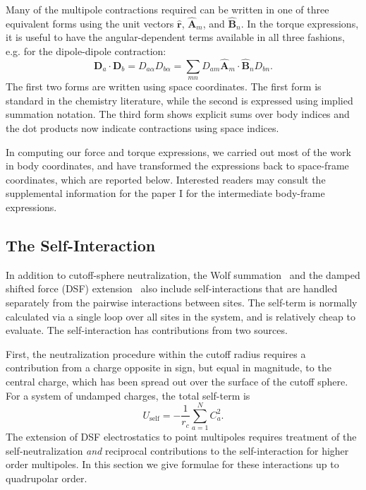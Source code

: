 Many of the multipole contractions required can be written in one of
three equivalent forms using the unit vectors $\hat{\mathbf{r}}$, $\hat{\mathbf{A}}_m$,
and $\hat{\mathbf{B}}_n$. In the torque expressions, it is useful to have the
angular-dependent terms available in all three fashions, e.g. for the
dipole-dipole contraction:
%
\begin{equation}
 \mathbf{D}_a \cdot \mathbf{D}_b
= D_{a \alpha} D_{b \alpha} =
\sum_{mn} D_{am} \hat{\mathbf{A}}_m \cdot \hat{\mathbf{B}}_n D_{bn}.
\end{equation}
%
The first two forms are written using space coordinates.  The first
form is standard in the chemistry literature, while the second is
expressed using implied summation notation.  The third form shows
explicit sums over body indices and the dot products now indicate
contractions using space indices. 

In computing our force and torque expressions, we carried out most of
the work in body coordinates, and have transformed the expressions
back to space-frame coordinates, which are reported below.  Interested
readers may consult the supplemental information for the paper I \cite{PaperI} for the intermediate body-frame expressions.\cite{supplemental}

\subsection{The Self-Interaction \label{sec:selfTerm}}

In addition to cutoff-sphere neutralization, the Wolf
summation~\cite{Wolf99} and the damped shifted force (DSF)
extension~\cite{Gezelter06} also include self-interactions that
are handled separately from the pairwise interactions between
sites. The self-term is normally calculated via a single loop over all
sites in the system, and is relatively cheap to evaluate. The
self-interaction has contributions from two sources.

First, the neutralization procedure within the cutoff radius requires
a contribution from a charge opposite in sign, but equal in magnitude,
to the central charge, which has been spread out over the surface of
the cutoff sphere.  For a system of undamped charges, the total
self-term is
\begin{equation}
U_\textrm{self} = - \frac{1}{r_c} \sum_{a=1}^N C_a^{2}.
\label{eq:selfTerm}
\end{equation}
The extension of DSF electrostatics to point multipoles requires
treatment of the self-neutralization \textit{and} reciprocal
contributions to the self-interaction for higher order multipoles.  In
this section we give formulae for these interactions up to quadrupolar
order.

